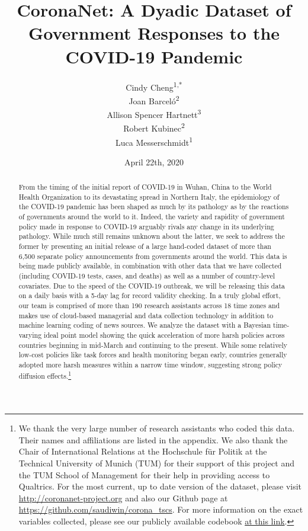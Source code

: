 \documentclass[]{article}
\title{CoronaNet: A Dyadic Dataset of Government Responses to the COVID-19 Pandemic}
\author{Cindy Cheng\textsuperscript{1,*} \\ Joan Barceló\textsuperscript{2} \\ Allison Spencer Hartnett\textsuperscript{3} \\ Robert Kubinec\textsuperscript{2} \\ Luca Messerschmidt\textsuperscript{1}}
\date{April 22th, 2020}
\let\rmarkdownfootnote\footnote%
\def\footnote{\protect\rmarkdownfootnote}
\begin{document}
\maketitle
\begin{abstract}
From the timing of the initial report of COVID-19 in Wuhan, China to the World Health Organization to its devastating spread in Northern Italy, the epidemiology of the COVID-19 pandemic has been shaped as much by its pathology as by the reactions of governments around the world to it. Indeed, the variety and rapidity of government policy made in response to COVID-19 arguably rivals any change in its underlying pathology. While much still remains unknown about the latter, we seek to address the former by presenting an initial release of a large hand-coded dataset of more than 6,500 separate policy announcements from governments around the world. This data is being made publicly available, in combination with other data that we have collected (including COVID-19 tests, cases, and deaths) as well as a number of country-level covariates. Due to the speed of the COVID-19 outbreak, we will be releasing this data on a daily basis with a 5-day lag for record validity checking. In a truly global effort, our team is comprised of more than 190 research assistants across 18 time zones and makes use of cloud-based managerial and data collection technology in addition to machine learning coding of news sources. We analyze the dataset with a Bayesian time-varying ideal point model showing the quick acceleration of more harsh policies across countries beginning in mid-March and continuing to the present. While some relatively low-cost policies like task forces and health monitoring began early, countries generally adopted more harsh measures within a narrow time window, suggesting strong policy diffusion effects.\footnote{We thank the very large number of research assistants who coded this data. Their names and affiliations are listed in the appendix. We also thank the Chair of International Relations at the Hochschule für Politik at the Technical University of Munich (TUM) for their support of this project and the TUM School of Management for their help in providing access to Qualtrics. For the most current, up to date version of the dataset, please visit \url{http://coronanet-project.org} and also our Github page at \url{https://github.com/saudiwin/corona_tscs}. For more information on the exact variables collected, please see our publicly available codebook \href{https://docs.google.com/document/d/1zvNMpwj0onFvUZ_gLl4RRjqS-clbHv3TIX6EOHofsME/edit?usp=sharing}{at this link}.}
\end{abstract}
\end{document}
